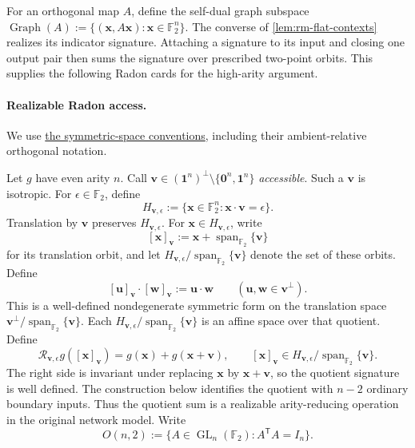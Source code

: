 \documentclass[11pt,letterpaper,onecolumn]{article}
\theoremstyle{plain}
\theoremstyle{definition}
\theoremstyle{remark}
\newcommand{\Ftwo}{\mathbb F_2}
\newcommand{\Span}{\operatorname{span}}
\newcommand{\one}{\mathbf 1}
\newcommand{\zero}{\mathbf 0}
\begin{document}
For an orthogonal map \(A\), define the self-dual graph subspace
\(\operatorname{Graph}(A):=\{({\mathbf{x}},A{\mathbf{x}}):{\mathbf{x}}\in\Ftwo^n\}\).  The converse of
\cref{lem:rm-flat-contexts} realizes its indicator signature.
Attaching a signature to its input and closing one output pair then sums
the signature over prescribed two-point orbits.  This supplies the
following Radon cards for the high-arity argument.

\paragraph{Realizable Radon access.}

We use \hyperref[subsubsec:symmetric-binary-spaces]{the symmetric-space conventions},
including their ambient-relative orthogonal notation.

Let \(g\) have even arity \(n\).  Call
\({\mathbf{v}}\in(\one^n)^\perp\setminus\{\zero^n,\one^n\}\) \emph{accessible}.  Such a
\({\mathbf{v}}\) is isotropic.  For \(\epsilon\in\Ftwo\), define
\[
 H_{{\mathbf{v}},\epsilon}:=\{{\mathbf{x}}\in\Ftwo^n:{\mathbf{x}}\cdot {\mathbf{v}}=\epsilon\}.
\]
Translation by \({\mathbf{v}}\) preserves \(H_{{\mathbf{v}},\epsilon}\).  For
\({\mathbf{x}}\in H_{{\mathbf{v}},\epsilon}\), write
\[
 [{\mathbf{x}}]_{\mathbf{v}}:={\mathbf{x}}+\Span_{\Ftwo}\{{\mathbf{v}}\}
\]
for its translation orbit, and let
\(H_{{\mathbf{v}},\epsilon}/\Span_{\Ftwo}\{{\mathbf{v}}\}\) denote the set of these orbits.  Define
\[
 [{\mathbf{u}}]_{\mathbf{v}}\cdot[{\mathbf{w}}]_{\mathbf{v}}:={\mathbf{u}}\cdot {\mathbf{w}}
 \qquad({\mathbf{u}},{\mathbf{w}}\in {\mathbf{v}}^\perp).
\]
This is a well-defined nondegenerate symmetric form on the translation
space \({\mathbf{v}}^\perp/\Span_{\Ftwo}\{{\mathbf{v}}\}\). Each
\(H_{{\mathbf{v}},\epsilon}/\Span_{\Ftwo}\{{\mathbf{v}}\}\) is an affine space over that quotient.
Define
\hypertarget{eq:rm-radon-card}{}
\begin{equation*}
  \mathcal R_{{\mathbf{v}},\epsilon}g([{\mathbf{x}}]_{\mathbf{v}})
  =g({\mathbf{x}})+g({\mathbf{x}}+{\mathbf{v}}),
  \qquad [{\mathbf{x}}]_{\mathbf{v}}\in H_{{\mathbf{v}},\epsilon}/\Span_{\Ftwo}\{{\mathbf{v}}\}.
\end{equation*}
The right side is invariant under replacing \({\mathbf{x}}\) by \({\mathbf{x}}+{\mathbf{v}}\), so the
quotient signature is well defined.  The construction below identifies
the quotient with \(n-2\) ordinary boundary inputs.  Thus the quotient
sum is a realizable arity-reducing operation in the original network model.
Write
\[
 O(n,2):=\{A\in\operatorname{GL}_n(\Ftwo):A^{\mathsf T}A=I_n\}.
\]
\end{document}
